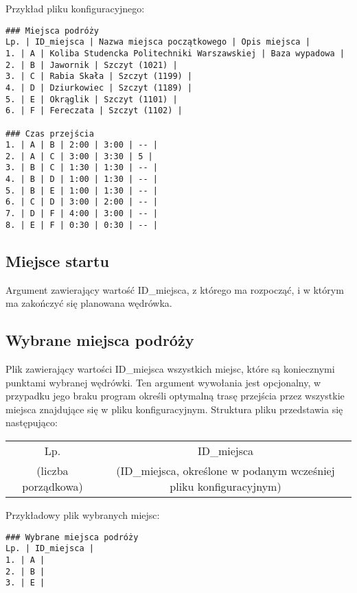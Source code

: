 \documentclass{article}
\begin{document}
\newline \newline
Przykład pliku konfiguracyjnego:
\begin{verbatim}
### Miejsca podróży
Lp. | ID_miejsca | Nazwa miejsca początkowego | Opis miejsca |
1. | A | Koliba Studencka Politechniki Warszawskiej | Baza wypadowa |
2. | B | Jawornik | Szczyt (1021) |
3. | C | Rabia Skała | Szczyt (1199) |
4. | D | Dziurkowiec | Szczyt (1189) |
5. | E | Okrąglik | Szczyt (1101) |
6. | F | Fereczata | Szczyt (1102) |

### Czas przejścia
1. | A | B | 2:00 | 3:00 | -- |
2. | A | C | 3:00 | 3:30 | 5 |
3. | B | C | 1:30 | 1:30 | -- |
4. | B | D | 1:00 | 1:30 | -- |
5. | B | E | 1:00 | 1:30 | -- |
6. | C | D | 3:00 | 2:00 | -- |
7. | D | F | 4:00 | 3:00 | -- |
8. | E | F | 0:30 | 0:30 | -- |
\end{verbatim}
\subsection{Miejsce startu}
Argument zawierający wartość ID\_miejsca, z którego ma rozpocząć, i w którym ma zakończyć się planowana wędrówka.
\subsection{Wybrane miejsca podróży}
Plik zawierający wartości ID\_miejsca wszystkich miejsc, które są koniecznymi punktami wybranej wędrówki. Ten argument wywołania jest opcjonalny, w przypadku jego braku program określi optymalną trasę przejścia przez wszystkie miejsca znajdujące się w pliku konfiguracyjnym. Struktura pliku przedstawia się następująco: 
\newline \newline
\begin{tabular}{c|c}
Lp. & ID_miejsca\\
(liczba porządkowa) & (ID_miejsca, określone w podanym wcześniej pliku konfiguracyjnym) \\ 
\end{tabular}
\newline \newline
Przykładowy plik wybranych miejsc:
\begin{verbatim}
### Wybrane miejsca podróży
Lp. | ID_miejsca |
1. | A |
2. | B |
3. | E |
\end{verbatim}
\end{document}
